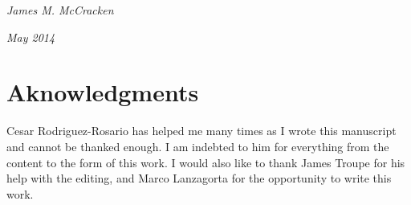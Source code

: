 \hfill{\em  James M. McCracken}

\hfill{\em May 2014}




\newpage
\chapter*{Aknowledgments}
Cesar Rodriguez-Rosario has helped me many times as I wrote this manuscript and cannot be thanked enough.  I am indebted to him for everything from the content to the form of this work.  I would also like to thank James Troupe for his help with the editing, and Marco Lanzagorta for the opportunity to write this work.

\newpage


